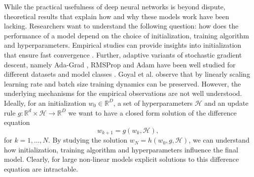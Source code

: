 \documentclass[12pt]{article}
\theoremstyle{definition}
\numberwithin{equation}{section}
\newcommand{\R}{\mathbb{R}}
\newcommand{\CH}{\mathcal{H}}
\begin{document}
While the practical usefulness of deep neural networks is beyond dispute, theoretical results that explain how and why these models work have been lacking. Researchers want to understand the following question: how does the performance of a model depend on the choice of initialization, training algorithm and hyperparameters. Empirical studies can provide insights into initialization that ensure fast convergence \cite{glorotUnderstandingDifficultyTraining2010, heDelvingDeepRectifiers2015a}. Further, adaptive variants of stochastic gradient descent, namely Ada-Grad \cite{duchiAdaptiveSubgradientMethods2011}, RMSProp \cite{geoffreyhintonnitishsrivastavaandkevinswer-NeuralNetworksMachine2012} and Adam \cite{kingmaAdamMethodStochastic2017} have been well studied for different datasets and model classes \cite{wilsonMarginalValueAdaptive2017}. Goyal et al. \cite{goyalAccurateLargeMinibatch2018} observe that by linearly scaling learning rate and batch size training dynamics can be preserved. 
However, the underlying mechanisms for the empirical observations are not well understood. Ideally, for an initialization $w_0 \in \R^D$, a set of hyperparameters $\CH$ and an update rule $g : \R^d \times \CH \rightarrow \R^D$ we want to have a closed form solution of the difference equation
\begin{equation*}
  w_{k+1} = g(w_k, \CH),
\end{equation*}
for $k = 1,\dots, N$. By studying the solution $w_N = h(w_0, g, \CH)$, we can understand how initialization, training algorithm and hyperparameters influence the final model. Clearly, for large non-linear models explicit solutions to this difference equation are intractable. 
\end{document}
